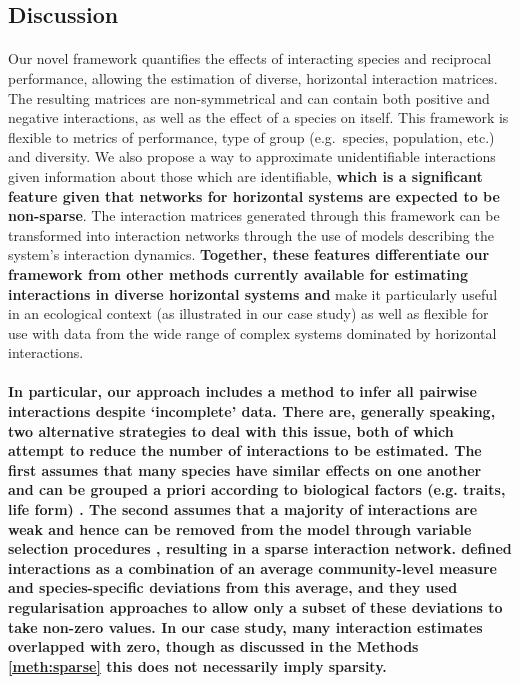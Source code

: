 \documentclass[a4,12pt]{article}
\begin{document}
\begin{refsection}
\section{Discussion}


    \paragraph{} 
    Our novel framework quantifies the effects of interacting species and reciprocal performance, allowing the estimation of diverse, horizontal interaction matrices. The resulting matrices are non-symmetrical and can contain both positive and negative interactions, as well as the effect of a species on itself. This framework is flexible to metrics of performance, type of group (e.g.\ species, population, etc.) and diversity. We also propose a way to approximate unidentifiable interactions given information about those which are identifiable, \textbf{which is a significant feature given that networks for horizontal systems are expected to be non-sparse}. The interaction matrices generated through this framework can be transformed into interaction networks through the use of models describing the system's interaction dynamics. \textbf{Together, these features differentiate our framework from other methods currently available for estimating interactions in diverse horizontal systems and} make it particularly useful in an ecological context (as illustrated in our case study) as well as flexible for use with data from the wide range of complex systems dominated by horizontal interactions.

    \paragraph{}
    \textbf{In particular, our approach includes a method to infer all pairwise interactions despite `incomplete' data. There are, generally speaking, two alternative strategies to deal with this issue, both of which attempt to reduce the number of interactions to be estimated. The first assumes that many species have similar effects on one another and can be grouped a priori according to biological factors (e.g. traits, life form) \parencite{Uriarte2004, Martyn2020}. The second assumes that a majority of interactions are weak and hence can be removed from the model through variable selection procedures \parencite{Mutshinda2009, Weiss-Lehman2022}, resulting in a sparse interaction network. \textcite{Weiss-Lehman2022} defined interactions as a combination of an average community-level measure and species-specific deviations from this average, and they used regularisation approaches to allow only a subset of these deviations to take non-zero values. In our case study, many interaction estimates overlapped with zero, though as discussed in the Methods \ref{meth:sparse} this does not necessarily imply sparsity.}


\end{refsection}
\end{document}
